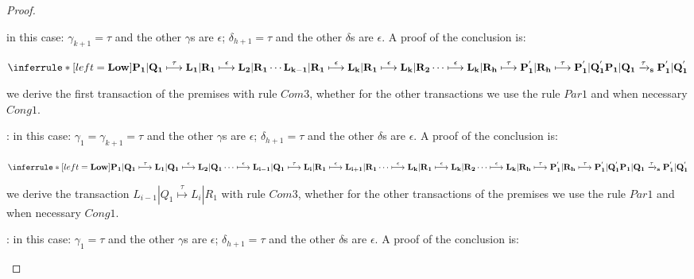 \begin{proposition}
\begin{proof}
\begin{description}
\begin{description}
	    in this case: $\gamma_{k+1}=\tau$ and the other $\gamma$s are $\epsilon$; $\delta_{h+1}=\tau$ and the other $\delta$s are $\epsilon$. A proof of the conclusion is:
	    \begin{center}
	      $\inferrule* [left=\bf{Low}]{
		  P_{1}|Q_{1} \stackrel{\tau}{\longmapsto} L_{1}|R_{1} 
			      \stackrel{\epsilon}{\longmapsto} L_{2}|R_{1}
		  \cdots
		\\
		  L_{k-1}|R_{1} \stackrel{\epsilon}{\longmapsto} L_{k}|R_{1}
				\stackrel{\epsilon}{\longmapsto} L_{k}|R_{2}
		  \cdots 
				\stackrel{\epsilon}{\longmapsto} L_{k}|R_{h}
				\stackrel{\tau}{\longmapsto} P_{1}^{'}|R_{h}
				\stackrel{\tau}{\longmapsto} P_{1}^{'}|Q_{1}^{'}
	      }{
		P_{1}|Q_{1} \xrightarrow{\tau}_{s} P_{1}^{'}|Q_{1}^{'}
	      }$	  
	    \end{center}
	    we derive the first transaction of the premises with rule $Com3$, whether for the other transactions we use the rule $Par1$ and when necessary $Cong1$.
	  \item[$\gamma_{i}=\overline{x}y$ $and$ $\delta_{1}=xy$]:
	    in this case: $\gamma_{1}=\gamma_{k+1}=\tau$ and the other $\gamma$s are $\epsilon$; $\delta_{h+1}=\tau$ and the other $\delta$s are $\epsilon$. A proof of the conclusion is:
	    \begin{center}
	      $\inferrule* [left=\bf{Low}]{
		  P_{1}|Q_{1} \stackrel{\tau}{\longmapsto} L_{1}|Q_{1} 
			      \stackrel{\epsilon}{\longmapsto} L_{2}|Q_{1}
		  \cdots
			      \stackrel{\epsilon}{\longmapsto} L_{i-1}|Q_{1} 
			      \stackrel{\tau}{\longmapsto} L_{i}|R_{1}
			      \stackrel{\epsilon}{\longmapsto} L_{i+1}|R_{1}
		  \\\cdots 
			      \stackrel{\epsilon}{\longmapsto} L_{k}|R_{1}
			      \stackrel{\epsilon}{\longmapsto} L_{k}|R_{2}
		  \cdots 
			      \stackrel{\epsilon}{\longmapsto} L_{k}|R_{h}
			      \stackrel{\tau}{\longmapsto} P_{1}^{'}|R_{h}
			      \stackrel{\tau}{\longmapsto} P_{1}^{'}|Q_{1}^{'}
	      }{
		P_{1}|Q_{1} \xrightarrow{\tau}_{s} P_{1}^{'}|Q_{1}^{'}
	      }$	  
	    \end{center}
	    we derive the transaction $ L_{i-1}|Q_{1} \stackrel{\tau}{\longmapsto} L_{i}|R_{1}$ with rule $Com3$, whether for the other transactions of the premises we use the rule $Par1$ and when necessary $Cong1$.
	  \item[$\gamma_{k+1}=\overline{x}y$ $and$ $\delta_{1}=xy$]:
	    in this case: $\gamma_{1}=\tau$ and the other $\gamma$s are $\epsilon$; $\delta_{h+1}=\tau$ and the other $\delta$s are $\epsilon$. A proof of the conclusion is:

\end{description}
\end{description}
\end{proof}
\end{proposition}

